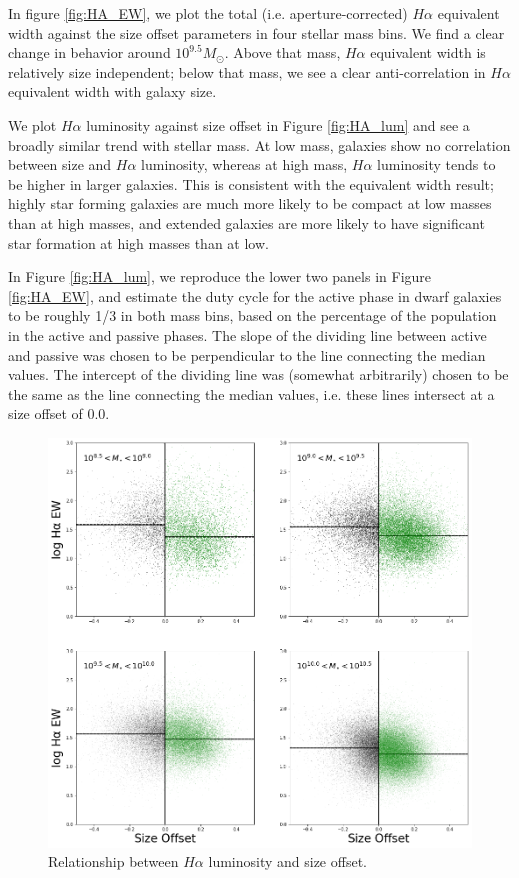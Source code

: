 \documentclass[iop]{emulateapj}
\begin{document}
In figure \ref{fig:HA_EW}, we plot the total (i.e. aperture-corrected) $H\alpha$ equivalent width against the size offset parameters in four stellar mass bins. We find a clear change in behavior around $10^{9.5} M_{\odot}$. Above that mass, $H\alpha$ equivalent width is relatively size independent; below that mass, we see a clear anti-correlation in  $H \alpha$ equivalent width with galaxy size.

We plot $H\alpha$ luminosity against size offset in Figure \ref{fig:HA_lum} and see a broadly similar trend with stellar mass. At low mass, galaxies show no correlation between size and $H\alpha$ luminosity, whereas at high mass, $H\alpha$ luminosity tends to be higher in larger galaxies. This is consistent with the equivalent width result; highly star forming galaxies are much more likely to be compact at low masses than at high masses, and extended galaxies are more likely to have significant star formation at high masses than at low.   

In Figure \ref{fig:HA_lum}, we reproduce the lower two panels in Figure \ref{fig:HA_EW}, and estimate the duty cycle for the active phase in dwarf galaxies to be roughly 1/3 in both mass bins, based on the percentage of the population in the active and passive phases. The slope of the dividing line between active and passive was chosen to be perpendicular to the line connecting the median values. The intercept of the dividing line was (somewhat arbitrarily) chosen to be the same as the line connecting the median values, i.e. these lines intersect at a size offset of 0.0. 

\begin{figure}
	\centering
	\includegraphics[width=1.5 \columnwidth]{ha_ew_2x2.png}
	\caption{Relationship between $H\alpha$ luminosity and size offset. }
	\label{fig:HA_ew}
	
\end{figure}
\end{document}
